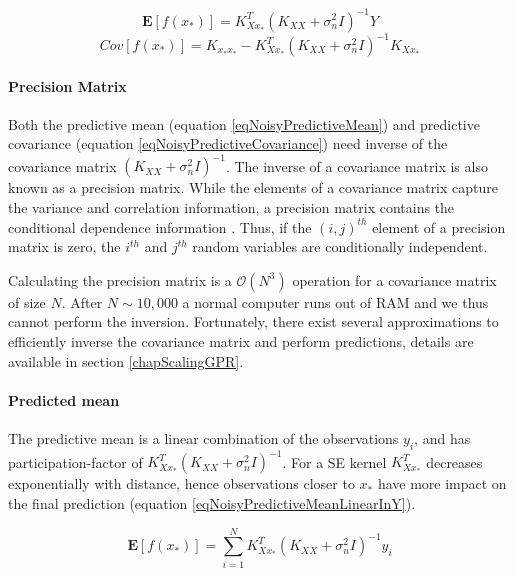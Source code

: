   \begin{equation}\label{eqNoisyPredictiveMean}
  \mathbf{E}[f(x_{*})] = K_{Xx_{*}}^{T}( K_{XX} + \sigma^{2}_{n}I)^{-1}Y
  \end{equation}
  \begin{equation}\label{eqNoisyPredictiveCovariance}
	Cov[f(x_{*})] = K_{x_{*}x_{*}} - K_{Xx_{*}}^{T}( K_{XX} + \sigma^{2}_{n}I )^{-1} K_{Xx_{*}}
  \end{equation}

\paragraph{Precision Matrix}  
Both the predictive mean (equation \ref{eqNoisyPredictiveMean}) and predictive covariance (equation \ref{eqNoisyPredictiveCovariance}) need inverse of the covariance matrix \(( K_{XX} + \sigma^{2}_{n}I)^{-1}\). The inverse of a covariance matrix is also known as a precision matrix. While the elements of a covariance matrix capture the variance and correlation information, a precision matrix contains the conditional dependence information \cite{mackay2003information}. Thus, if the \((i, j)^{th}\) element of a precision matrix is zero, the \(i^{th}\) and \(j^{th}\) random variables are conditionally independent. 

Calculating the precision matrix is a \(\mathcal{O}\left ( N^{3} \right )\) operation for a covariance matrix of size \(N\). After \(N \sim 10,000\) a normal computer runs out of RAM and we thus cannot perform the inversion. Fortunately, there exist several approximations to efficiently inverse the covariance matrix and perform predictions, details are available in section \ref{chapScalingGPR}.

\paragraph{Predicted mean}
The predictive mean is a linear combination of the observations \(y_{i}\), and has participation-factor of \(K_{Xx_{*}}^{T}( K_{XX} + \sigma^{2}_{n}I)^{-1}\). For a SE kernel \(K_{Xx_{*}}^{T}\) decreases exponentially with distance, hence observations closer to \(x_{*}\) have more impact on the final prediction (equation \ref{eqNoisyPredictiveMeanLinearInY}). 
  
  \begin{equation}\label{eqNoisyPredictiveMeanLinearInY}
  \mathbf{E}[f(x_{*})] = \sum_{i = 1}^{N} K_{Xx_{*}}^{T}( K_{XX} + \sigma^{2}_{n}I)^{-1}y_{i}
  \end{equation}

